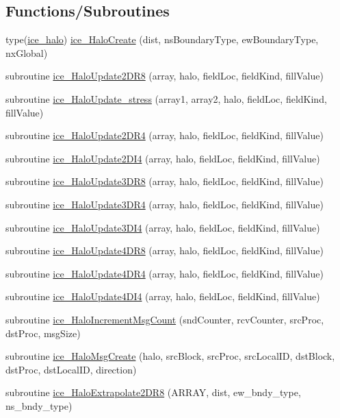 \subsection*{Functions/Subroutines}
\begin{DoxyCompactItemize}
\item 
type(\hyperlink{typeice__boundary_1_1ice__halo}{ice\_\-halo}) \hyperlink{namespaceice__boundary_a75ebd3c57772fed459b69767634757d0}{ice\_\-HaloCreate} (dist, nsBoundaryType, ewBoundaryType, nxGlobal)
\item 
subroutine \hyperlink{namespaceice__boundary_a87df2a8a2b6172c4e0e56332a02521b8}{ice\_\-HaloUpdate2DR8} (array, halo, fieldLoc, fieldKind, fillValue)
\item 
subroutine \hyperlink{namespaceice__boundary_abc01c17b506f2d8ae4df422170803c6a}{ice\_\-HaloUpdate\_\-stress} (array1, array2, halo, fieldLoc, fieldKind, fillValue)
\item 
subroutine \hyperlink{namespaceice__boundary_ab91c33c3f42ce191fc4edd0d19f8e6ac}{ice\_\-HaloUpdate2DR4} (array, halo, fieldLoc, fieldKind, fillValue)
\item 
subroutine \hyperlink{namespaceice__boundary_a2054b95b373530c4cc9db12585f020dc}{ice\_\-HaloUpdate2DI4} (array, halo, fieldLoc, fieldKind, fillValue)
\item 
subroutine \hyperlink{namespaceice__boundary_a1b2030ac006215973cc7919ed7a0b8ba}{ice\_\-HaloUpdate3DR8} (array, halo, fieldLoc, fieldKind, fillValue)
\item 
subroutine \hyperlink{namespaceice__boundary_a124672d4024a3a64a1c1ed1b8c8d000b}{ice\_\-HaloUpdate3DR4} (array, halo, fieldLoc, fieldKind, fillValue)
\item 
subroutine \hyperlink{namespaceice__boundary_aded647fb747da9f8efb04f5a67a4247b}{ice\_\-HaloUpdate3DI4} (array, halo, fieldLoc, fieldKind, fillValue)
\item 
subroutine \hyperlink{namespaceice__boundary_adbf64712e93e11b0d0b099666f723af3}{ice\_\-HaloUpdate4DR8} (array, halo, fieldLoc, fieldKind, fillValue)
\item 
subroutine \hyperlink{namespaceice__boundary_a57e7b05282c54e5996798a87fa1a2e16}{ice\_\-HaloUpdate4DR4} (array, halo, fieldLoc, fieldKind, fillValue)
\item 
subroutine \hyperlink{namespaceice__boundary_aae151e9a894787fddeb6510b20919203}{ice\_\-HaloUpdate4DI4} (array, halo, fieldLoc, fieldKind, fillValue)
\item 
subroutine \hyperlink{namespaceice__boundary_af0d91bf9b575aaf512efac718c9b099c}{ice\_\-HaloIncrementMsgCount} (sndCounter, rcvCounter, srcProc, dstProc, msgSize)
\item 
subroutine \hyperlink{namespaceice__boundary_afcc8942d5d5ac4c20ac64915b98f376c}{ice\_\-HaloMsgCreate} (halo, srcBlock, srcProc, srcLocalID, dstBlock, dstProc, dstLocalID, direction)
\item 
subroutine \hyperlink{namespaceice__boundary_a9a42897a89fe284fadbec048591e5742}{ice\_\-HaloExtrapolate2DR8} (ARRAY, dist, ew\_\-bndy\_\-type, ns\_\-bndy\_\-type)
\end{DoxyCompactItemize}
